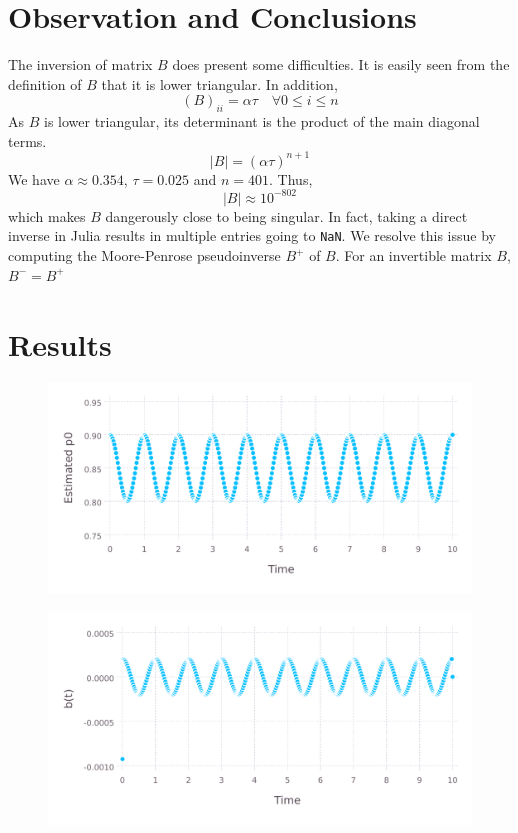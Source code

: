 \documentclass{ifacconf}
\begin{document}
\section{Observation and Conclusions}
The inversion of matrix $B$ does present some difficulties. It is easily seen from the
definition of $B$ that it is lower triangular. In addition,
\[
	(B)_{ii} = \alpha\tau \quad \forall 0\le i \le n
\]
As $B$ is lower triangular, its determinant is the product of the main diagonal terms.
\[
	|B| = (\alpha\tau)^{n+1}
\]
We have $\alpha \approx 0.354$, $\tau = 0.025$ and $n=401$. Thus,
\[
	|B| \approx 10^{-802}
\]
which makes $B$ dangerously close to being singular. In fact, taking a direct inverse in Julia results in
multiple entries going to \texttt{NaN}. We resolve this issue by computing the
Moore-Penrose pseudoinverse $B^+$ of $B$. For an invertible matrix $B$, $B^- = B^+$
\clearpage

\section{Results}
\begin{figure}[h]
	\label{fig:estv}
	\includegraphics[scale=0.9]{estv.pdf}
\end{figure}

\begin{figure}[h]
	\label{fig:estb}
	\includegraphics[scale=0.9]{estb.pdf}
\end{figure}
\end{document}
